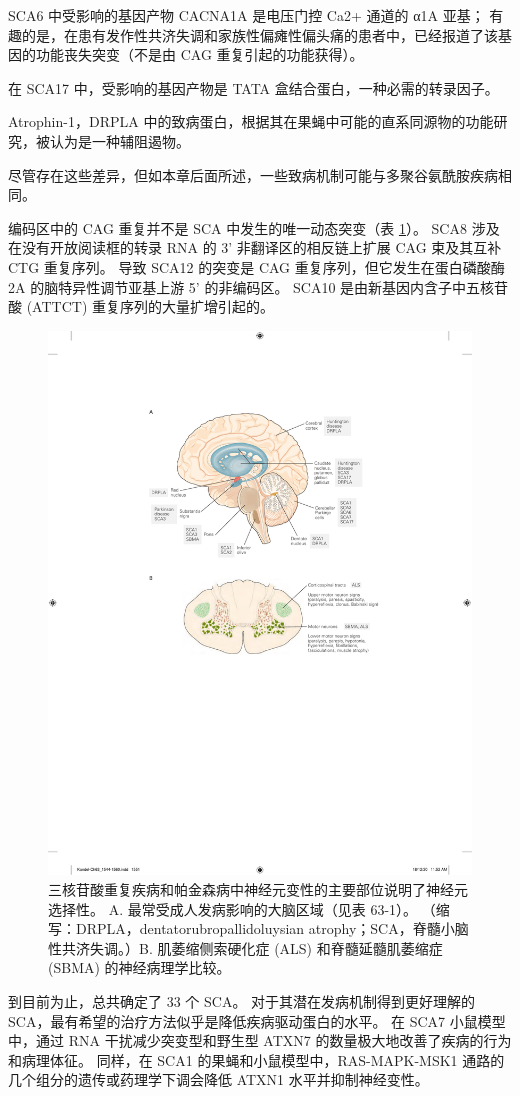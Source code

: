 SCA6 中受影响的基因产物 CACNA1A 是电压门控 Ca2+ 通道的 α1A 亚基；
有趣的是，在患有发作性共济失调和家族性偏瘫性偏头痛的患者中，已经报道了该基因的功能丧失突变（不是由 CAG 重复引起的功能获得）。


在 SCA17 中，受影响的基因产物是 TATA 盒结合蛋白，一种必需的转录因子。


Atrophin-1，DRPLA 中的致病蛋白，根据其在果蝇中可能的直系同源物的功能研究，被认为是一种辅阻遏物。


尽管存在这些差异，但如本章后面所述，一些致病机制可能与多聚谷氨酰胺疾病相同。


编码区中的 CAG 重复并不是 SCA 中发生的唯一动态突变（表 \ref{fig:63_2}）。
SCA8 涉及在没有开放阅读框的转录 RNA 的 3' 非翻译区的相反链上扩展 CAG 束及其互补 CTG 重复序列。
导致 SCA12 的突变是 CAG 重复序列，但它发生在蛋白磷酸酶 2A 的脑特异性调节亚基上游 5' 的非编码区。
SCA10 是由新基因内含子中五核苷酸 (ATTCT) 重复序列的大量扩增引起的。


\begin{figure}[htbp]
	\centering
	\includegraphics[width=0.7\linewidth]{chap63/fig_63_2}
	\caption{三核苷酸重复疾病和帕金森病中神经元变性的主要部位说明了神经元选择性。 A. 最常受成人发病影响的大脑区域（见表 63-1）。 （缩写：DRPLA，dentatorubropallidoluysian atrophy；SCA，脊髓小脑性共济失调。）B. 肌萎缩侧索硬化症 (ALS) 和脊髓延髓肌萎缩症 (SBMA) 的神经病理学比较。}
	\label{fig:63_2}
\end{figure}


到目前为止，总共确定了 33 个 SCA。 对于其潜在发病机制得到更好理解的 SCA，最有希望的治疗方法似乎是降低疾病驱动蛋白的水平。
在 SCA7 小鼠模型中，通过 RNA 干扰减少突变型和野生型 ATXN7 的数量极大地改善了疾病的行为和病理体征。
同样，在 SCA1 的果蝇和小鼠模型中，RAS-MAPK-MSK1 通路的几个组分的遗传或药理学下调会降低 ATXN1 水平并抑制神经变性。



